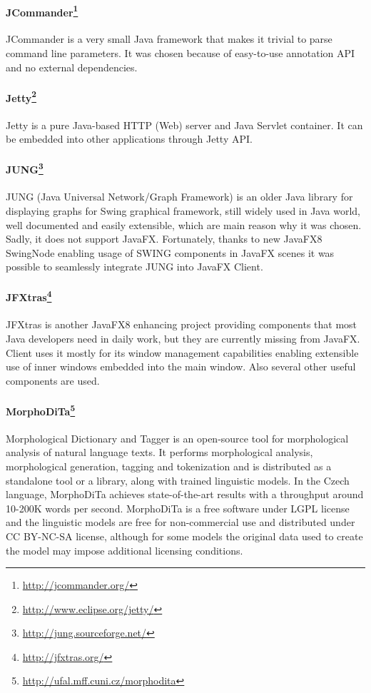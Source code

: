 \paragraph{JCommander\footnote{\url{http://jcommander.org/}}}
JCommander is a very small Java framework that makes it trivial to parse command
line parameters. It was chosen because of easy-to-use annotation API and no
external dependencies.

\paragraph{Jetty\footnote{\url{http://www.eclipse.org/jetty/}}}
Jetty is a pure Java-based HTTP (Web) server and Java Servlet container. It can
be embedded into other applications through Jetty API.

\paragraph{JUNG\footnote{\url{http://jung.sourceforge.net/}}}
JUNG (Java Universal Network/Graph Framework) is an older Java library for
displaying graphs for Swing graphical framework, still widely used in Java
world, well documented and easily extensible, which are main reason why it was
chosen. Sadly, it does not support JavaFX. Fortunately, thanks to new JavaFX8
SwingNode enabling usage of SWING components in JavaFX scenes it was possible to
seamlessly integrate JUNG into JavaFX \textan{} Client.

\paragraph{JFXtras\footnote{\url{http://jfxtras.org/}}}
JFXtras is another JavaFX8 enhancing project providing components that
most Java developers need in daily work, but they are currently missing
from JavaFX. \textan{} Client uses it mostly for its window management
capabilities enabling extensible use of inner windows embedded into the main
window. Also several other useful components are used.

\paragraph{MorphoDiTa\footnote{\url{http://ufal.mff.cuni.cz/morphodita}}}
Morphological Dictionary and Tagger is an open-source tool for morphological
analysis of natural language texts. It performs morphological analysis, 
morphological generation, tagging and tokenization and is distributed as
a standalone tool or a library, along with trained linguistic models. In
the Czech language, MorphoDiTa achieves state-of-the-art results with 
a throughput around 10-200K words per second. MorphoDiTa is a free software
under LGPL license and the linguistic models are free for non-commercial use
and distributed under CC BY-NC-SA license, although for some models the original
data used to create the model may impose additional licensing conditions.

